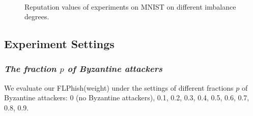 \documentclass[journal]{IEEEtran}
\begin{document}
\begin{figure}[!htp]
  \\
  \caption{Reputation values of experiments on MNIST on different imbalance degrees.}
  \label{fig_exp_reputation}
  \vspace{0.2in}
\end{figure}


\subsection{Experiment Settings}


  \subsubsection{{\textit{The fraction {$p$} of Byzantine attackers}}} We evaluate our FLPhish(weight) under the settings of different fractions $p$ of Byzantine attackers: 0 (no Byzantine attackers), 0.1, 0.2, 0.3, 0.4, 0.5, 0.6, 0.7, 0.8, 0.9.
\end{document}
